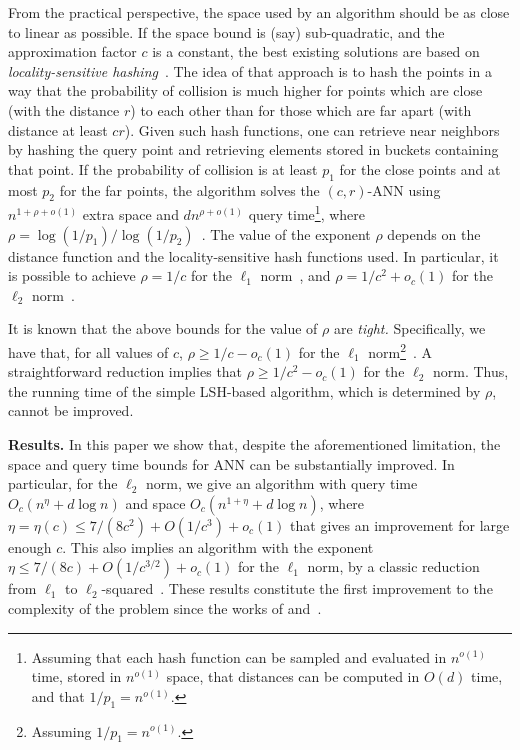 \documentclass[11pt,letterpaper]{article}
\renewcommand{\paragraph}[1]{{\bf #1.}}
\begin{document}
From the practical perspective, the space used by an algorithm should be as close to linear as possible. If the space bound is (say) sub-quadratic,  and the approximation factor $c$ is a constant, the best existing solutions are based on {\em locality-sensitive hashing}~\cite{im-anntr-98,him-anntr-12}. 
The idea of that approach is to hash the points in a way that the probability of collision is much higher for points which are close (with the distance $r$) to each other than for those which are far apart (with distance at least $cr$). Given such hash functions, one can retrieve near neighbors by hashing the query point and retrieving elements stored in buckets containing that point. 
  If the probability of collision is at least $p_1$ for the close points and at most $p_2$ for the far points, the algorithm solves the $(c, r)$-ANN using $n^{1+\rho+o(1)}$ extra space and $dn^{\rho+o(1)}$ query time\footnote{Assuming that each hash function can be sampled and evaluated in $n^{o(1)}$ time, stored in $n^{o(1)}$ space, that distances can be computed in $O(d)$ time, and that $1/p_1 =n^{o(1)}$.}, where $\rho=\log(1/p_1)/\log(1/p_2)$~\cite{him-anntr-12}. The value of the exponent $\rho$ depends on the distance function and the locality-sensitive hash functions used.
 In particular, it is possible to achieve $\rho=1/c$ for the $\ell_1$ norm~\cite{im-anntr-98}, and $\rho=1/c^2+o_c(1)$ for the 
 $\ell_2$ norm~\cite{ai-nohaa-06}.
 
It is known that   the above bounds for the value of $\rho$ are {\em  tight.} Specifically, we have that, for all values of $c$, $\rho \ge 1/c - o_c(1)$ for the $\ell_1$ norm\footnote{Assuming $1/p_1 =n^{o(1)}$.}~\cite{owz-olbls-11}. A straightforward reduction implies that $\rho \ge 1/c^2 - o_c(1)$ for the $\ell_2$ norm. Thus, the running time of the simple LSH-based algorithm, which is determined by $\rho$, cannot be improved.

\paragraph{Results} In this paper we show that, despite the aforementioned limitation,  the space and query time bounds for ANN can be substantially improved. In particular, for the $\ell_2$ norm, we give an algorithm with query time $O_c(n^{\eta} + d \log n)$ and space $O_c(n^{1+\eta} + d \log n)$, where $\eta =\eta(c) \le 7/(8 c^2) + O(1/c^3) + o_c(1)$ that gives an improvement for large enough $c$. This also implies an algorithm with the exponent $\eta \le 7/(8 c) + O(1/c^{3/2}) + o_c(1)$ for the $\ell_1$ norm, by a classic reduction from $\ell_1$ to $\ell_2$-squared~\cite{llr-ggsaa-95}. These results constitute the first improvement to the complexity of the problem since the works of \cite{im-anntr-98} and~\cite{ai-nohaa-06}.
\end{document}

